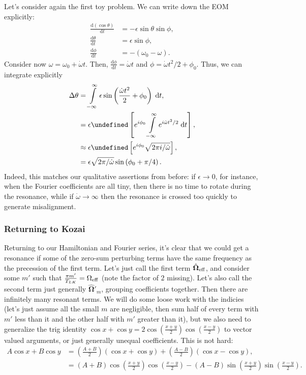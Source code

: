 \documentclass[11pt,
        usenames, %
        dvipsnames %
    ]{article}
\newcommand*{\rd}[2]{\frac{\mathrm{d}#1}{\mathrm{d}#2}}
\newcommand*{\bm}[1]{\boldsymbol{\mathbf{#1}}}
\newcommand*{\uv}[1]{\hat{\bm{#1}}}
\let\Im\undefined
\DeclareMathOperator{\Im}{Im}
\newcommand*{\p}[1]{\left(#1\right)}
\newcommand*{\s}[1]{\left[#1\right]}
\begin{document}
Let's consider again the first toy problem. We can write down the EOM
explicitly:
\begin{align}
    \rd{(\cos \theta)}{t} &= -\epsilon \sin \theta \sin \phi,\\
    \rd{\theta}{t} &= \epsilon \sin \phi,\\
    \rd{\phi}{t} &= -\p{\omega_0 - \omega}.
\end{align}
Consider now $\omega = \omega_0 + \dot{\omega}t$. Then, $\rd{\phi}{t} =
\dot{\omega}t$ and $\phi = \dot{\omega}t^2/2 + \phi_0$. Thus, we can integrate
explicitly
\begin{align}
    \Delta \theta &= \int\limits_{-\infty}^\infty
            \epsilon \sin \p{\frac{\dot{\omega}t^2}{2} + \phi_0}
                \;\mathrm{d}t,\\
        &= \epsilon \Im\s{e^{i\phi_0}\int\limits_{-\infty}^\infty
            e^{i\dot{\omega}t^2/2}\;\mathrm{d}t},\\
        &\approx \epsilon \Im \s{e^{i\phi_0}\sqrt{2\pi i/\dot{\omega}}},\\
        &= \epsilon \sqrt{2\pi/\dot{\omega}}\sin\p{\phi_0 + \pi/4}.
\end{align}
Indeed, this matches our qualitative assertions from before: if $\epsilon \to
0$, for instance, when the Fourier coefficients are all tiny, then there is no
time to rotate during the resonance, while if $\dot{\omega} \to \infty$ then the
resonance is crossed too quickly to generate misalignment.

\subsubsection{Returning to Kozai}

Returning to our Hamiltonian and Fourier series, it's clear that we could get a
resonance if some of the zero-sum perturbing terms have the same frequency as
the precession of the first term. Let's just call the first term
$\uv{\Omega}_{\rm eff}$, and consider some $m'$ such that $\frac{\pi
m'}{T_{LK}} = \Omega_{\rm eff}$ (note the factor of $2$ missing). Let's also
call the second term just generally $\uv{\Omega}'_m$, grouping coefficients
together. Then there are infinitely many resonant terms. We will do some loose
work with the indicies (let's just assume all the small $m$ are negligible, then
sum half of every term with $m'$ less than it and the other half with $m'$
greater than it), but we also need to generalize the trig identity $\cos x +
\cos y = 2\cos \p{\frac{x + y}{2}} \cos \p{\frac{x - y}{2}}$ to vector valued
arguments, or just generally unequal coefficients. This is not hard:
\begin{align}
    A\cos x + B \cos y &= \p{\frac{A + B}{2}}\p{\cos x + \cos y}
            + \p{\frac{A - B}{2}}\p{\cos x - \cos y},\\
        &= \p{A + B}\cos \p{\frac{x + y}{2}}\cos \p{\frac{x - y}{2}}
            - \p{A - B}\sin \p{\frac{x + y}{2}}\sin \p{\frac{x - y}{2}}.
\end{align}
\end{document}
